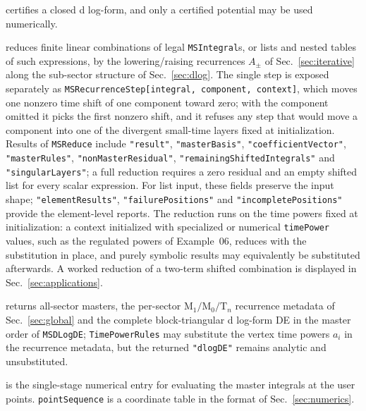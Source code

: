 \documentclass[11pt,a4paper]{article}
\numberwithin{table}{section}
\begin{document}
\begin{description}
        certifies a closed d log-form, and only a certified potential may be used numerically.
  \item[\texttt{MSReduce[expr, context, MasterBasis -> Automatic]}] reduces finite linear
        combinations of legal \texttt{MSIntegral}s, or lists and nested tables of such
        expressions, by
        the lowering/raising recurrences $A_\pm$ of Sec.~\ref{sec:iterative} along the
        sub-sector structure of Sec.~\ref{sec:dlog}. The single step is exposed separately as
        \texttt{MSRecurrenceStep[integral, component, context]}, which moves one nonzero time
        shift of one component toward zero; with the component omitted it picks the first nonzero
        shift, and it refuses any step that would move a component into one of the divergent
        small-time layers fixed at initialization. Results of \texttt{MSReduce} include
        \texttt{"result"}, \texttt{"masterBasis"}, \texttt{"coefficientVector"},
        \texttt{"masterRules"},
        \texttt{"nonMasterResidual"}, \texttt{"remainingShiftedIntegrals"} and
        \texttt{"singularLayers"}; a full reduction requires a zero residual and an empty shifted
        list for every scalar expression. For list input, these fields preserve the input
        shape; \texttt{"elementResults"}, \texttt{"failurePositions"} and
        \texttt{"incompletePositions"} provide the element-level reports. The reduction runs
        on the time powers fixed at initialization: a context initialized with specialized or
        numerical \texttt{timePower} values, such as the regulated powers of Example~06,
        reduces with the substitution in place, and purely symbolic results may equivalently
        be substituted afterwards. A worked reduction of a two-term shifted combination is
        displayed in Sec.~\ref{sec:applications}.
  \item[\texttt{MSFormulaData[context]}] returns all-sector masters, the per-sector
        $\text{M}_1/\text{M}_0/\text{T}_n$ recurrence metadata of Sec.~\ref{sec:global} and the complete
        block-triangular d log-form DE in the master order of \texttt{MSDLogDE};
        \texttt{TimePowerRules} may substitute the vertex time powers $a_i$ in the recurrence
        metadata, but the returned \texttt{"dlogDE"} remains analytic and unsubstituted.
  \item[\texttt{MSEvaluatePath[context, pointSequence, opts]}] is the single-stage numerical
        entry for evaluating the master integrals at the user points.
        \texttt{pointSequence} is a coordinate table in the format of Sec.~\ref{sec:numerics}.

\end{description}
\end{document}
